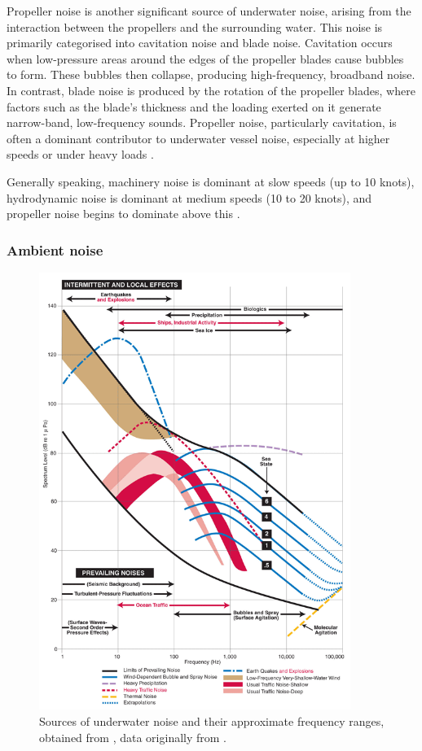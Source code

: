 Propeller noise is another significant source of underwater noise, arising from the interaction between the propellers and the surrounding water. This noise is primarily categorised into cavitation noise and blade noise. Cavitation occurs when low-pressure areas around the edges of the propeller blades cause bubbles to form. These bubbles then collapse, producing high-frequency, broadband noise. In contrast, blade noise is produced by the rotation of the propeller blades, where factors such as the blade’s thickness and the loading exerted on it generate narrow-band, low-frequency sounds. Propeller noise, particularly cavitation, is often a dominant contributor to underwater vessel noise, especially at higher speeds or under heavy loads \cite{malinowski_underwater_2001}.

Generally speaking, machinery noise is dominant at slow speeds (up to 10 knots), hydrodynamic noise is dominant at medium speeds (10 to 20 knots), and propeller noise begins to dominate above this \cite{waite_sonar_2002}. 

\subsubsection{Ambient noise}

\begin{figure}[p]
    \centering
    \includegraphics[width=0.9\textwidth]{img/ch1/uw_noise.png}
    \caption{Sources of underwater noise and their approximate frequency ranges, obtained from \cite{knowlton_what_nodate}, data originally from \cite{wenz_review_1972}.}
    \label{fig:uw-noise}
\end{figure}

